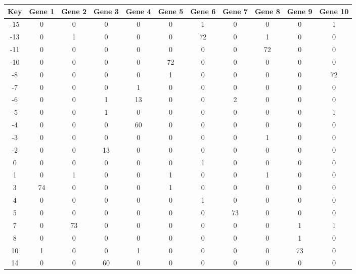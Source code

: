 \begin{tabular}{|c|c|c|c|c|c|c|c|c|c|c|}
\hline
Key & Gene 1 & Gene 2 & Gene 3 & Gene 4 & Gene 5 & Gene 6 & Gene 7 & Gene 8 & Gene 9 & Gene 10 \\
\hline
-15 & 0 & 0 & 0 & 0 & 0 & 1 & 0 & 0 & 0 & 1 \\
-13 & 0 & 1 & 0 & 0 & 0 & 72 & 0 & 1 & 0 & 0 \\
-11 & 0 & 0 & 0 & 0 & 0 & 0 & 0 & 72 & 0 & 0 \\
-10 & 0 & 0 & 0 & 0 & 72 & 0 & 0 & 0 & 0 & 0 \\
-8 & 0 & 0 & 0 & 0 & 1 & 0 & 0 & 0 & 0 & 72 \\
-7 & 0 & 0 & 0 & 1 & 0 & 0 & 0 & 0 & 0 & 0 \\
-6 & 0 & 0 & 1 & 13 & 0 & 0 & 2 & 0 & 0 & 0 \\
-5 & 0 & 0 & 1 & 0 & 0 & 0 & 0 & 0 & 0 & 1 \\
-4 & 0 & 0 & 0 & 60 & 0 & 0 & 0 & 0 & 0 & 0 \\
-3 & 0 & 0 & 0 & 0 & 0 & 0 & 0 & 1 & 0 & 0 \\
-2 & 0 & 0 & 13 & 0 & 0 & 0 & 0 & 0 & 0 & 0 \\
0 & 0 & 0 & 0 & 0 & 0 & 1 & 0 & 0 & 0 & 0 \\
1 & 0 & 1 & 0 & 0 & 1 & 0 & 0 & 1 & 0 & 0 \\
3 & 74 & 0 & 0 & 0 & 1 & 0 & 0 & 0 & 0 & 0 \\
4 & 0 & 0 & 0 & 0 & 0 & 1 & 0 & 0 & 0 & 0 \\
5 & 0 & 0 & 0 & 0 & 0 & 0 & 73 & 0 & 0 & 0 \\
7 & 0 & 73 & 0 & 0 & 0 & 0 & 0 & 0 & 1 & 1 \\
8 & 0 & 0 & 0 & 0 & 0 & 0 & 0 & 0 & 1 & 0 \\
10 & 1 & 0 & 0 & 1 & 0 & 0 & 0 & 0 & 73 & 0 \\
14 & 0 & 0 & 60 & 0 & 0 & 0 & 0 & 0 & 0 & 0 \\
\hline
\end{tabular}